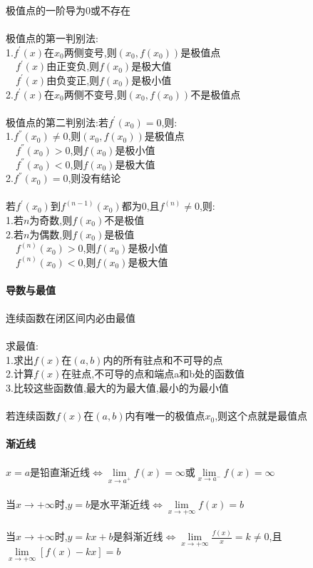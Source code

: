 \documentclass{article}
\begin{document}
\begin{flushleft}
	极值点的一阶导为0或不存在\\
	~\\
	极值点的第一判别法:\\
	1.$f^{'}(x)$在$x_0$两侧变号,则$(x_0,f(x_0))$是极值点\\
	\ \ $f^{'}(x)$由正变负,则$f(x_0)$是极大值\\
	\ \ $f^{'}(x)$由负变正,则$f(x_0)$是极小值\\
	2.$f^{'}(x)$在$x_0$两侧不变号,则$(x_0,f(x_0))$不是极值点\\
	~\\
	极值点的第二判别法:若$f^{'}(x_0)=0$,则:\\
	1.$f^{''}(x_0)\neq 0$,则$(x_0,f(x_0))$是极值点\\
	\ \ $f^{''}(x_0)>0$,则$f(x_0)$是极小值\\
	\ \ $f^{''}(x_0)<0$,则$f(x_0)$是极大值\\
	2.$f^{''}(x_0)=0$,则没有结论\\
	~\\
	若$f^{'}(x_0)$到$f^{(n-1)}(x_0)$都为0,且$f^{(n)}\neq 0$,则:\\
	1.若$n$为奇数,则$f(x_0)$不是极值\\
	2.若$n$为偶数,则$f(x_0)$是极值\\
	\ \ $f^{(n)}(x_0)>0$,则$f(x_0)$是极小值\\
	\ \ $f^{(n)}(x_0)<0$,则$f(x_0)$是极大值\\
	
	~\\ \textbf{导数与最值} \\~\\
	
	连续函数在闭区间内必由最值\\
	~\\
	求最值:\\
	1.求出$f(x)$在$(a,b)$内的所有驻点和不可导的点\\
	2.计算$f(x)$在驻点,不可导的点和端点a和b处的函数值\\
	3.比较这些函数值,最大的为最大值,最小的为最小值\\
	~\\
	若连续函数$f(x)$在$(a,b)$内有唯一的极值点$x_0$,则这个点就是最值点\\
	
	~\\ \textbf{渐近线} \\~\\
	
	$x=a$是铅直渐近线$\Leftrightarrow \lim\limits_{x\to a^+}f(x)=\infty$或$\lim\limits_{x\to a^-}f(x)=\infty$\\
	~\\
	当$x\to +\infty$时,$y=b$是水平渐近线$\Leftrightarrow \lim\limits_{x\to +\infty}f(x)=b$\\
	~\\
	当$x\to +\infty$时,$y=kx+b$是斜渐近线$\Leftrightarrow \lim\limits_{x\to +\infty}\frac{f(x)}{x}=k\neq 0$,且$\lim\limits_{x\to +\infty}[f(x)-kx]=b$\\
	

\end{flushleft}
\end{document}
